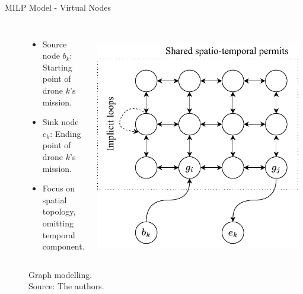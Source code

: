 \begin{frame}{MILP Model - Virtual Nodes}
    \begin{figure}
      \begin{columns}
        \begin{itemize}
           
            \item Source node $b_k$: Starting point of drone $k$'s mission.
            \item Sink node $e_k$: Ending point of drone $k$'s mission.
            
            \item Focus on spatial topology, omitting temporal component.
        \end{itemize}
        \caption{Graph modelling. \\ Source: The authors.}
        \label{fig_graph}
        \includegraphics[width=0.8\textwidth]{img/graph_model.pdf}
      \end{columns}
    \end{figure}
\end{frame}


